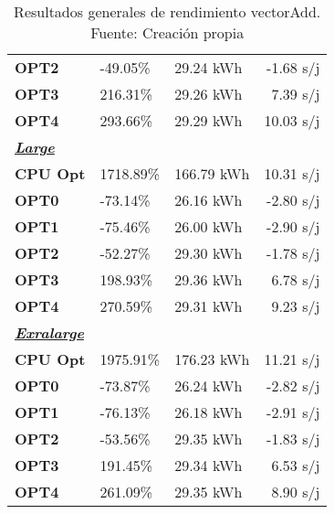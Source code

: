 \begin{table}[H]
\begin{tabular}{lllr}
    \cellcolor[HTML]{DAE8FC} \textbf{OPT2} & -49.05\%  &	29.24 kWh  &	-1.68 s/j \\
    \rowcolor[HTML]{EFEFEF} \cellcolor[HTML]{DAE8FC} \textbf{OPT3} &216.31\%  &	29.26 kWh  &	7.39 s/j \\
    \cellcolor[HTML]{DAE8FC} \textbf{OPT4} & 293.66\%  &	29.29 kWh  &	10.03 s/j \\
    \rowcolor[HTML]{EFEFEF} \cellcolor[HTML]{DAE8FC} \textbf{\textbf{{\emph{{\underline{{Large}}}}}}} &&	&	 \\
    \cellcolor[HTML]{DAE8FC} \textbf{CPU Opt} & 1718.89\%  &	166.79 kWh  &	10.31 s/j \\
    \rowcolor[HTML]{EFEFEF} \cellcolor[HTML]{DAE8FC} \textbf{OPT0} &-73.14\%  &	26.16 kWh  &	-2.80 s/j \\
    \cellcolor[HTML]{DAE8FC} \textbf{OPT1} & -75.46\%  &	26.00 kWh  &	-2.90 s/j \\
    \rowcolor[HTML]{EFEFEF} \cellcolor[HTML]{DAE8FC} \textbf{OPT2} &-52.27\%  &	29.30 kWh  &	-1.78 s/j \\
    \cellcolor[HTML]{DAE8FC} \textbf{OPT3} & 198.93\%  &	29.36 kWh  &	6.78 s/j \\
    \rowcolor[HTML]{EFEFEF} \cellcolor[HTML]{DAE8FC} \textbf{OPT4} &270.59\%  &	29.31 kWh  &	9.23 s/j \\
    \cellcolor[HTML]{DAE8FC} \textbf{\textbf{{\emph{{\underline{{Exralarge}}}}}}} & &	&	 \\
    \rowcolor[HTML]{EFEFEF} \cellcolor[HTML]{DAE8FC} \textbf{CPU Opt} &1975.91\%  &	176.23 kWh  &	11.21 s/j \\
    \cellcolor[HTML]{DAE8FC} \textbf{OPT0} & -73.87\%  &	26.24 kWh  &	-2.82 s/j \\
    \rowcolor[HTML]{EFEFEF} \cellcolor[HTML]{DAE8FC} \textbf{OPT1} &-76.13\%  &	26.18 kWh  &	-2.91 s/j \\
    \cellcolor[HTML]{DAE8FC} \textbf{OPT2} & -53.56\%  &	29.35 kWh  &	-1.83 s/j \\
    \rowcolor[HTML]{EFEFEF} \cellcolor[HTML]{DAE8FC} \textbf{OPT3} &191.45\%  &	29.34 kWh  &	6.53 s/j \\
    \cellcolor[HTML]{DAE8FC} \textbf{OPT4} & 261.09\%  &	29.35 kWh  &	8.90 s/j \\
    \end{tabular}
    \caption[Resultados generales de rendimiento vectorAdd]{{Resultados generales de rendimiento vectorAdd. Fuente: Creación propia}}
    \label{table_global_vectorAdd_PowerResults_speedup-energy}
\end{table}